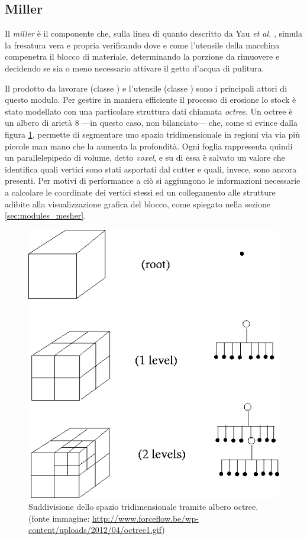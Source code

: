\subsection{Miller}
Il \emph{miller} è il componente che, sulla linea di quanto descritto da Yau \textit{et al.} \cite{yau_CNCSimulation}, simula la fresatura vera e propria verificando dove e come l'utensile della macchina compenetra il blocco di materiale, determinando la porzione da rimuovere e decidendo se sia o meno necessario attivare il getto d'acqua di pulitura.

Il prodotto da lavorare (classe ) e l'utensile (classe ) sono i principali attori di questo modulo. Per gestire in maniera efficiente il processo di erosione lo stock è stato modellato con una particolare struttura dati chiamata \emph{octree}. Un octree è un albero di arietà 8 ---in questo caso, non bilanciato--- che, come si evince dalla figura \ref{fig:octree_explanation}, permette di segmentare uno spazio tridimensionale in regioni via via più piccole man mano che la aumenta la profondità. Ogni foglia rappresenta quindi un parallelepipedo di volume, detto \emph{voxel}, e su di essa è salvato un valore che identifica quali vertici sono stati asportati dal cutter e quali, invece, sono ancora presenti. Per motivi di performance a ciò si aggiungono le informazioni necessarie a calcolare le coordinate dei vertici stessi ed un collegamento alle strutture adibite alla visualizzazione grafica del blocco, come spiegato nella sezione \ref{sec:modules_mesher}.
\begin{figure}[htp]
	\centering
	\includegraphics[width=.75\textwidth]{img/octree_explanation}
	\caption{Suddivisione dello spazio tridimensionale tramite albero octree. {\footnotesize (fonte immagine: \url{http://www.forceflow.be/wp-content/uploads/2012/04/octree1.gif})}}
	\label{fig:octree_explanation}
\end{figure}


